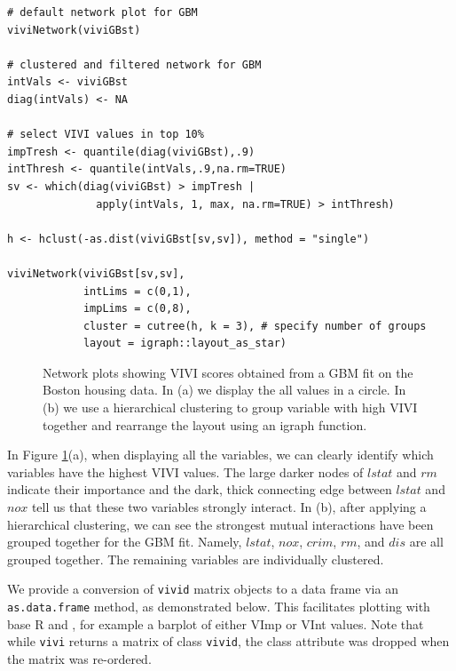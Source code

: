 \begin{verbatim}
# default network plot for GBM
viviNetwork(viviGBst)

# clustered and filtered network for GBM
intVals <- viviGBst
diag(intVals) <- NA 

# select VIVI values in top 10%
impTresh <- quantile(diag(viviGBst),.9)
intThresh <- quantile(intVals,.9,na.rm=TRUE)
sv <- which(diag(viviGBst) > impTresh |
              apply(intVals, 1, max, na.rm=TRUE) > intThresh)
              
h <- hclust(-as.dist(viviGBst[sv,sv]), method = "single")

viviNetwork(viviGBst[sv,sv],
            intLims = c(0,1),
            impLims = c(0,8),
            cluster = cutree(h, k = 3), # specify number of groups
            layout = igraph::layout_as_star)
\end{verbatim}

\begin{figure}

{\centering {}

}

\caption{Network plots showing VIVI scores obtained from a GBM fit on the Boston housing data. In (a) we display the all values in a circle. In (b) we use a hierarchical clustering to group variable with high VIVI together and rearrange the layout using an igraph function.}\label{fig:networks1}
\end{figure}

In Figure \ref{fig:networks1}(a), when displaying all the variables, we can clearly identify which variables have the highest VIVI values. The large darker nodes of \(lstat\) and \(rm\) indicate their importance and the dark, thick connecting edge between \(lstat\) and \(nox\) tell us that these two variables strongly interact. In (b), after applying a hierarchical clustering, we can see the strongest mutual interactions have been grouped together for the GBM fit. Namely, \(lstat\), \(nox\), \(crim\), \(rm\), and \(dis\) are all grouped together. The remaining variables are individually clustered.

We provide a conversion of \texttt{vivid} matrix objects to a data frame via an \texttt{as.data.frame} method, as demonstrated below. This facilitates plotting with base R and , for example a barplot of either VImp or VInt values. Note that while \texttt{vivi} returns a matrix of class \texttt{vivid}, the class attribute was dropped when the matrix was re-ordered.

